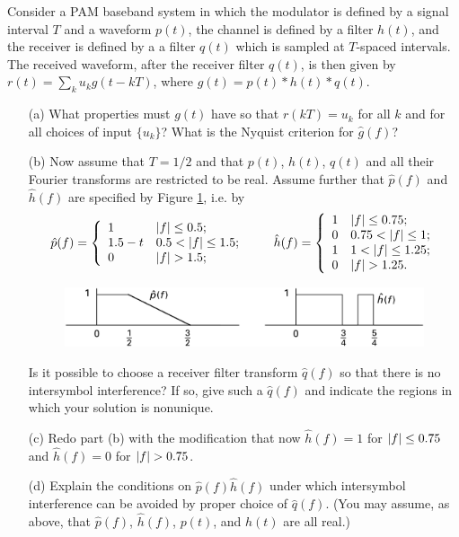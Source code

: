 \documentclass{assignment}
\begin{document}
\begin{prob}[6.6, Nyquist]
    Consider a PAM baseband system in which the modulator is defined by a signal interval $T$ and a waveform $p(t)$, the channel is defined by a filter $h(t)$, and the receiver is defined by a a filter $q(t)$ which is sampled at $T$-spaced intervals. The received waveform, after the receiver filter $q(t)$, is then given by $r(t)=\sum_ku_kg(t-kT)$, where $g(t)=p(t)*h(t)*q(t)$.
    \begin{itemize}
        \item[(a)] What properties must $g(t)$ have so that $r(kT)=u_k$ for all $k$ and for all choices of input $\{u_k\}$? What is the Nyquist criterion for $\hat{g}(f)$?
        \item[(b)] Now assume that $T=1/2$ and that $p(t)$, $h(t)$, $q(t)$ and all their Fourier transforms are restricted to be real. Assume further that $\hat{p}(f)$ and $\hat{h}(f)$ are specified by Figure \ref{Figure 6.10}, i.e. by
        \[
            \hat{p}(f)=\left\{\begin{array}{ll}
                1&\left\lvert f\right\rvert\leq 0.5;\\
                1.5-t&0.5<\left\lvert f\right\rvert\leq 1.5;\\
                0&\left\lvert f\right\rvert>1.5;
            \end{array}\right.\qquad\hat{h}(f)=\left\{\begin{array}{ll}
                1&\left\lvert f\right\rvert\leq 0.75;\\
                0&0.75<\left\lvert f\right\rvert\leq 1;\\
                1&1<\left\lvert f\right\rvert\leq 1.25;\\
                0&\left\lvert f\right\rvert>1.25.
            \end{array}\right.
        \]
        \begin{figure}[h]
            \centering
            \includegraphics[width=.5\columnwidth]{Assignment-10-Figure-6.10.png}
            \caption{}
            \label{Figure 6.10}
        \end{figure}
        Is it possible to choose a receiver filter transform $\hat{q}(f)$ so that there is no intersymbol interference? If so, give such a $\hat{q}(f)$ and indicate the regions in which your solution is nonunique.
        \item[(c)] Redo part (b) with the modification that now $\hat{h}(f)=1$ for $\left\lvert f\right\rvert\leq 0.75$ and $\hat{h}(f)=0$ for $\left\lvert f\right\rvert>0.75$.
        \item[(d)] Explain the conditions on $\hat{p}(f)\hat{h}(f)$ under which intersymbol interference can be avoided by proper choice of $\hat{q}(f)$. (You may assume, as above, that $\hat{p}(f)$, $\hat{h}(f)$, $p(t)$, and $h(t)$ are all real.)
    \end{itemize}
\end{prob}
\end{document}
